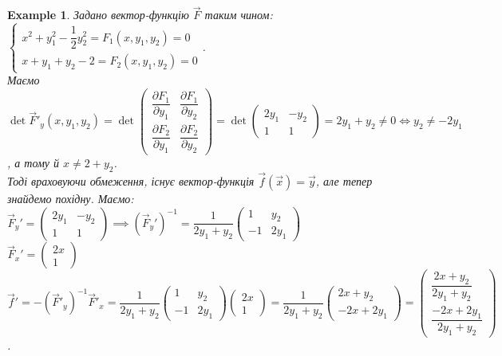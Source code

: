 \documentclass[a4paper, 10pt]{article}
\def\departial#1#2{\dfrac{\partial {#1}}{\partial {#2}}}
\theoremstyle{theoremdd}
\theoremstyle{theoremdd}
\theoremstyle{theoremdd}
\theoremstyle{theoremdd}
\newtheorem{example}[theorem]{Example}
\theoremstyle{theoremdd}
\theoremstyle{theoremdd}
\theoremstyle{theoremdd}
\theoremstyle{theoremdd}
\begin{document}
\begin{example}
Задано вектор-функцію $\vec{F}$ таким чином: $\begin{cases}
x^2+y_1^2 - \dfrac{1}{2}y_2^2 = F_1(x,y_1,y_2) = 0 \\
x+y_1+y_2-2 = F_2(x,y_1,y_2) = 0
\end{cases}$.\\
Маємо $\det \vec{F}'_y(x,y_1,y_2) = \det \begin{pmatrix}
\departial{F_1}{y_1} & \departial{F_1}{y_2} \\
\departial{F_2}{y_1} & \departial{F_2}{y_2} 
\end{pmatrix} = \det \begin{pmatrix}
2y_1 & -y_2 \\
1 & 1
\end{pmatrix} = 2y_1 + y_2 \neq 0 \iff y_2 \neq -2y_1$, а тому й $x \neq 2+y_2$.\\
Тоді враховуючи обмеження, існує вектор-функція $\vec{f}(\vec{x}) = \vec{y}$, але тепер знайдемо похідну. Маємо: \\
$\vec{F}_y' = \begin{pmatrix}
2y_1 & -y_2 \\
1 & 1
\end{pmatrix} \implies (\vec{F}_y')^{-1} = \dfrac{1}{2y_1+y_2} \begin{pmatrix}
1 & y_2 \\
-1 & 2y_1
\end{pmatrix}$\\
$\vec{F}_x' = \begin{pmatrix}
2x \\ 1
\end{pmatrix}$\\
$\vec{f}' = -(\vec{F}'_y)^{-1} \vec{F}'_x = \dfrac{1}{2y_1+y_2} \begin{pmatrix}
1 & y_2 \\
-1 & 2y_1
\end{pmatrix} \begin{pmatrix}
2x \\ 1
\end{pmatrix} = \dfrac{1}{2y_1+y_2} \begin{pmatrix}
2x + y_2 \\ -2x + 2y_1
\end{pmatrix} = \begin{pmatrix}
\dfrac{2x+y_2}{2y_1+y_2} \\ \dfrac{-2x+2y_1}{2y_1+y_2}
\end{pmatrix}$.
\end{example}
\end{document}
